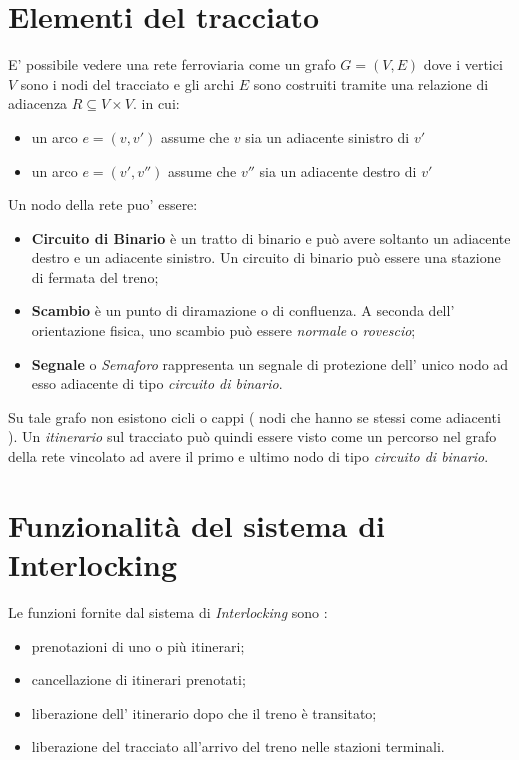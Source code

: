 \documentclass[10pt,a4paper,oneside]{report}
\begin{document}
\section{Elementi del tracciato}
E' possibile vedere una rete ferroviaria come un grafo $G =(V,E) $ dove i vertici $V$ sono i nodi del tracciato e gli archi $E$ sono costruiti tramite una relazione di adiacenza $R \subseteq V \times V$. in cui:
\begin{itemize}
\item un arco $e=(v,v')$ assume che $v$ sia un adiacente sinistro di $v'$
\item un arco $e=(v',v'')$ assume che $v''$ sia un adiacente destro di $v'$
\end{itemize}
Un nodo della rete puo' essere:
\begin{itemize}
\item \textbf{Circuito di Binario} è un tratto di binario e può avere soltanto un adiacente destro e un adiacente sinistro. Un circuito di binario può essere una stazione di fermata del treno;
\item \textbf{Scambio} è un punto di diramazione o di confluenza. A seconda dell' orientazione fisica, uno scambio può essere \textit{normale} o \textit{rovescio};
\item \textbf{Segnale} o \emph{Semaforo} rappresenta un segnale di protezione dell' unico nodo ad esso adiacente di tipo \emph{circuito di binario}.
\end{itemize}
Su tale grafo non esistono cicli o cappi ( nodi che hanno se stessi come adiacenti ).
Un \emph{itinerario} sul tracciato può quindi essere visto come un percorso nel grafo della rete vincolato ad avere il primo e ultimo nodo di tipo \emph{circuito di binario}.
\section{Funzionalità del sistema di Interlocking}
Le funzioni fornite dal sistema di \emph{Interlocking} sono :
\begin{itemize}
\item prenotazioni di uno o più itinerari;
\item cancellazione di itinerari prenotati;
\item liberazione dell' itinerario dopo che il treno è transitato;
\item liberazione del tracciato all'arrivo del treno nelle stazioni terminali.
\end{itemize}
\end{document}
